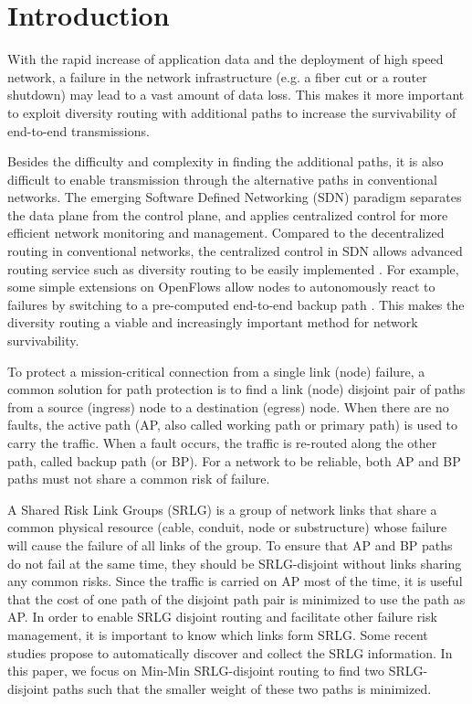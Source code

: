 \section{Introduction}
With the rapid increase of application data and the deployment of high speed network, a failure in the network infrastructure (e.g. a fiber cut or a router shutdown) may lead to a vast amount of data loss. This makes it more important to exploit diversity routing with additional paths to increase the survivability \cite{yallouz2017tunable} of end-to-end transmissions.

Besides the difficulty and complexity in finding the additional paths, it is also difficult to enable transmission through the alternative paths in conventional networks. The emerging Software Defined Networking (SDN) paradigm \cite{mckeown2008openflow,jain2013b4} separates the data plane from the control plane, and applies centralized control for more efficient network monitoring and management. Compared to the decentralized routing in conventional networks, the centralized control in SDN allows advanced routing service such as diversity routing to be easily implemented \cite{jarschel2014interfaces,muller2014survivor,lopez2016role}. For example, some simple extensions on OpenFlows allow nodes to autonomously react to failures by switching to a pre-computed end-to-end backup path \cite{kempf2012scalable,sgambelluri2013openflow}. This makes the diversity routing a viable and increasingly important method for network survivability.

To protect a mission-critical connection from a single link (node) failure, a common solution for path protection \cite{kuipers2012overview} is to find a link (node) disjoint pair of paths from a source (ingress) node to a destination (egress) node. When there are no faults, the active path (AP, also called working path or primary path) is used to carry the traffic. When a fault occurs, the traffic is re-routed along the other path, called backup path (or BP). For a network to be reliable, both AP and BP paths must not share a common risk of failure.

A Shared Risk Link Groups (SRLG) is a group of network links that share a common physical resource (cable, conduit, node or substructure) whose failure will cause the failure of all links of the group.
To ensure that AP and BP paths do not fail at the same time, they should be SRLG-disjoint without links sharing any common risks. Since the traffic is carried on AP most of the time, it is useful that the cost of one path of the disjoint path pair is minimized to use the  path as AP. In order to enable SRLG disjoint routing and facilitate other failure risk management, it is important to know which links form SRLG. Some recent studies \cite{sebos2001auto,zhang2017rsvp} propose to automatically discover and collect the SRLG information. %
In this paper, we focus on Min-Min SRLG-disjoint routing to find two SRLG-disjoint paths such that the smaller weight of these two paths is minimized.


